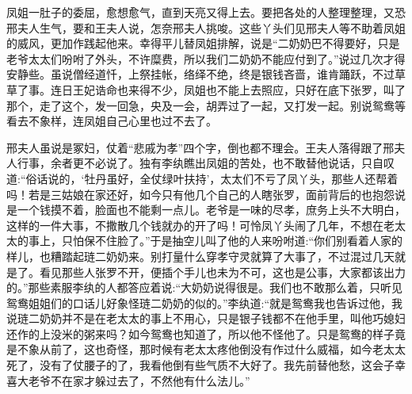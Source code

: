 \begin{parag}
    凤姐一肚子的委屈，愈想愈气，直到天亮又得上去。要把各处的人整理整理，又恐邢夫人生气，要和王夫人说，怎奈邢夫人挑唆。这些丫头们见邢夫人等不助着凤姐的威风，更加作践起他来。幸得平儿替凤姐排解，说是“二奶奶巴不得要好，只是老爷太太们吩咐了外头，不许糜费，所以我们二奶奶不能应付到了。”说过几次才得安静些。虽说僧经道忏，上祭挂帐，络绎不绝，终是银钱吝啬，谁肯踊跃，不过草草了事。连日王妃诰命也来得不少，凤姐也不能上去照应，只好在底下张罗，叫了那个，走了这个，发一回急，央及一会，胡弄过了一起，又打发一起。别说鸳鸯等看去不象样，连凤姐自己心里也过不去了。
\end{parag}


\begin{parag}
    邢夫人虽说是冢妇，仗着“悲戚为孝”四个字，倒也都不理会。王夫人落得跟了邢夫人行事，余者更不必说了。独有李纨瞧出凤姐的苦处，也不敢替他说话，只自叹道:“俗话说的，‘牡丹虽好，全仗绿叶扶持’，太太们不亏了凤丫头，那些人还帮着吗！若是三姑娘在家还好，如今只有他几个自己的人瞎张罗，面前背后的也抱怨说是一个钱摸不着，脸面也不能剩一点儿。老爷是一味的尽孝，庶务上头不大明白，这样的一件大事，不撒散几个钱就办的开了吗！可怜凤丫头闹了几年，不想在老太太的事上，只怕保不住脸了。”于是抽空儿叫了他的人来吩咐道:“你们别看着人家的样儿，也糟踏起琏二奶奶来。别打量什么穿孝守灵就算了大事了，不过混过几天就是了。看见那些人张罗不开，便插个手儿也未为不可，这也是公事，大家都该出力的。”那些素服李纨的人都答应着说:“大奶奶说得很是。我们也不敢那么着，只听见鸳鸯姐姐们的口话儿好象怪琏二奶奶的似的。”李纨道:“就是鸳鸯我也告诉过他，我说琏二奶奶并不是在老太太的事上不用心，只是银子钱都不在他手里，叫他巧媳妇还作的上没米的粥来吗？如今鸳鸯也知道了，所以他不怪他了。只是鸳鸯的样子竟是不象从前了，这也奇怪，那时候有老太太疼他倒没有作过什么威福，如今老太太死了，没有了仗腰子的了，我看他倒有些气质不大好了。我先前替他愁，这会子幸喜大老爷不在家才躲过去了，不然他有什么法儿。”
\end{parag}


